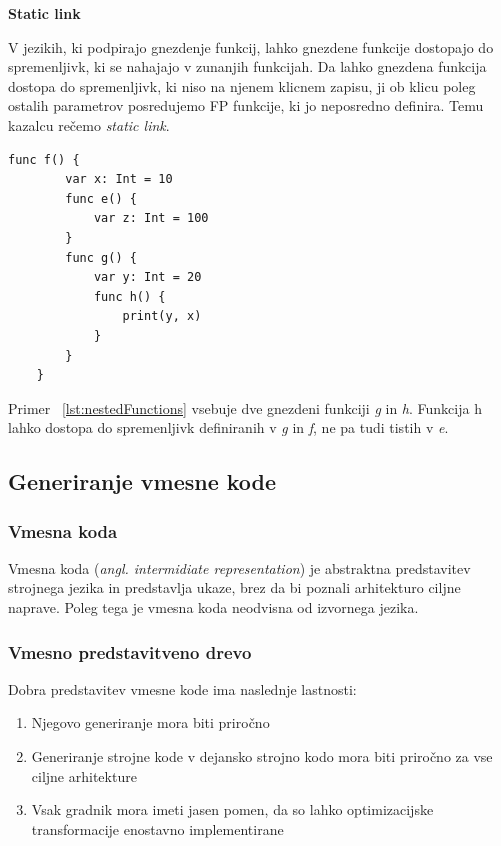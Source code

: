 \documentclass[a4paper, 12pt]{book}
\begin{document}
\textbf{Static link}

V jezikih, ki podpirajo gnezdenje funkcij, lahko gnezdene funkcije dostopajo do spremenljivk, ki se nahajajo v zunanjih funkcijah. Da lahko gnezdena funkcija dostopa do spremenljivk, ki niso na njenem klicnem zapisu, ji ob klicu poleg ostalih parametrov posredujemo FP funkcije, ki jo neposredno definira. Temu kazalcu rečemo \textit{static link}. 

\begin{lstlisting}[caption={Primer gnezdenih funkcij}, captionpos=b, label={lst:nestedFunctions}]
    func f() {
        var x: Int = 10
        func e() {
            var z: Int = 100
        }
        func g() {
            var y: Int = 20
            func h() {
                print(y, x)
            }
        }
    }
\end{lstlisting}

Primer ~\ref{lst:nestedFunctions} vsebuje dve gnezdeni funkciji \textit{g} in \textit{h}. Funkcija h lahko dostopa do spremenljivk definiranih v \textit{g} in \textit{f}, ne pa tudi tistih v \textit{e}.

\subsection{Generiranje vmesne kode}   

\subsubsection{Vmesna koda}

Vmesna koda (\textit{angl. intermidiate representation}) je abstraktna predstavitev strojnega jezika in predstavlja ukaze, brez da bi poznali arhitekturo ciljne naprave. Poleg tega je vmesna koda neodvisna od izvornega jezika. \cite{modernCompiler} \\

\subsubsection{Vmesno predstavitveno drevo}

\indent Dobra predstavitev vmesne kode ima naslednje lastnosti:

\begin{enumerate}
	\item Njegovo generiranje mora biti priročno
	\item Generiranje strojne kode v dejansko strojno kodo mora biti priročno za vse ciljne arhitekture
	\item Vsak gradnik mora imeti jasen pomen, da so lahko optimizacijske transformacije enostavno implementirane
\end{enumerate}
\cite{modernCompiler}
\end{document}

